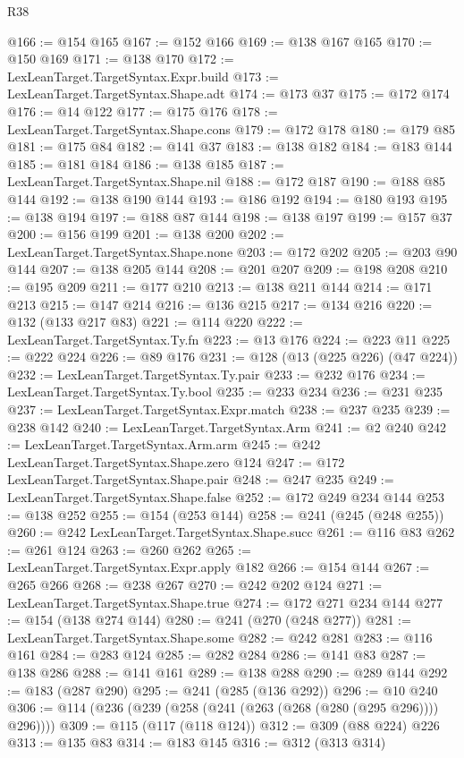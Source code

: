 \begin{lexlean}{R38}
\begin{coremodule}
@166 := @154 @165
@167 := @152 @166
@169 := @138 @167 @165
@170 := @150 @169
@171 := @138 @170
@172 := LexLeanTarget.TargetSyntax.Expr.build
@173 := LexLeanTarget.TargetSyntax.Shape.adt
@174 := @173 @37
@175 := @172 @174
@176 := @14 @122
@177 := @175 @176
@178 := LexLeanTarget.TargetSyntax.Shape.cons
@179 := @172 @178
@180 := @179 @85
@181 := @175 @84
@182 := @141 @37
@183 := @138 @182
@184 := @183 @144
@185 := @181 @184
@186 := @138 @185
@187 := LexLeanTarget.TargetSyntax.Shape.nil
@188 := @172 @187
@190 := @188 @85 @144
@192 := @138 @190 @144
@193 := @186 @192
@194 := @180 @193
@195 := @138 @194
@197 := @188 @87 @144
@198 := @138 @197
@199 := @157 @37
@200 := @156 @199
@201 := @138 @200
@202 := LexLeanTarget.TargetSyntax.Shape.none
@203 := @172 @202
@205 := @203 @90 @144
@207 := @138 @205 @144
@208 := @201 @207
@209 := @198 @208
@210 := @195 @209
@211 := @177 @210
@213 := @138 @211 @144
@214 := @171 @213
@215 := @147 @214
@216 := @136 @215
@217 := @134 @216
@220 := @132 (@133 @217 @83)
@221 := @114 @220
@222 := LexLeanTarget.TargetSyntax.Ty.fn
@223 := @13 @176
@224 := @223 @11
@225 := @222 @224
@226 := @89 @176
@231 := @128 (@13 (@225 @226) (@47 @224))
@232 := LexLeanTarget.TargetSyntax.Ty.pair
@233 := @232 @176
@234 := LexLeanTarget.TargetSyntax.Ty.bool
@235 := @233 @234
@236 := @231 @235
@237 := LexLeanTarget.TargetSyntax.Expr.match
@238 := @237 @235
@239 := @238 @142
@240 := LexLeanTarget.TargetSyntax.Arm
@241 := @2 @240
@242 := LexLeanTarget.TargetSyntax.Arm.arm
@245 := @242 LexLeanTarget.TargetSyntax.Shape.zero @124
@247 := @172 LexLeanTarget.TargetSyntax.Shape.pair
@248 := @247 @235
@249 := LexLeanTarget.TargetSyntax.Shape.false
@252 := @172 @249 @234 @144
@253 := @138 @252
@255 := @154 (@253 @144)
@258 := @241 (@245 (@248 @255))
@260 := @242 LexLeanTarget.TargetSyntax.Shape.succ
@261 := @116 @83
@262 := @261 @124
@263 := @260 @262
@265 := LexLeanTarget.TargetSyntax.Expr.apply @182
@266 := @154 @144
@267 := @265 @266
@268 := @238 @267
@270 := @242 @202 @124
@271 := LexLeanTarget.TargetSyntax.Shape.true
@274 := @172 @271 @234 @144
@277 := @154 (@138 @274 @144)
@280 := @241 (@270 (@248 @277))
@281 := LexLeanTarget.TargetSyntax.Shape.some
@282 := @242 @281
@283 := @116 @161
@284 := @283 @124
@285 := @282 @284
@286 := @141 @83
@287 := @138 @286
@288 := @141 @161
@289 := @138 @288
@290 := @289 @144
@292 := @183 (@287 @290)
@295 := @241 (@285 (@136 @292))
@296 := @10 @240
@306 := @114 (@236 (@239 (@258 (@241 (@263 (@268 (@280 (@295 @296)))) @296))))
@309 := @115 (@117 (@118 @124))
@312 := @309 (@88 @224) @226
@313 := @135 @83
@314 := @183 @145
@316 := @312 (@313 @314)

\end{coremodule}
\end{lexlean}
